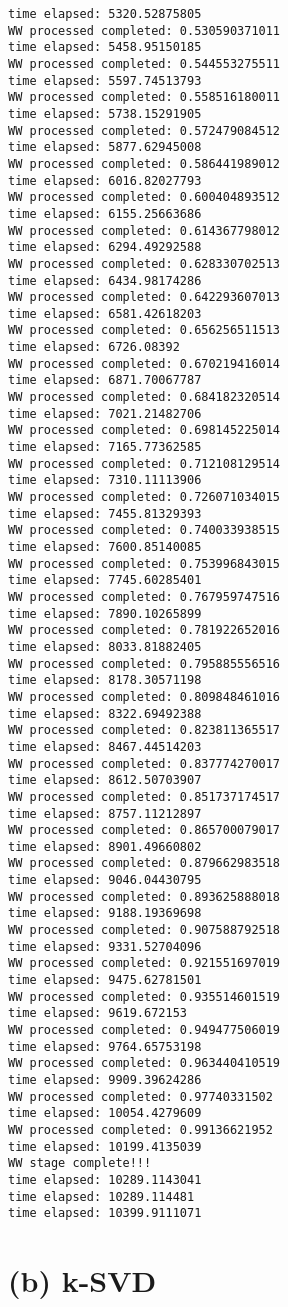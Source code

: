\documentclass[11pt]{article}
\begin{document}
\begin{Verbatim}[commandchars=\\\{\}]
time elapsed: 5320.52875805
WW processed completed: 0.530590371011
time elapsed: 5458.95150185
WW processed completed: 0.544553275511
time elapsed: 5597.74513793
WW processed completed: 0.558516180011
time elapsed: 5738.15291905
WW processed completed: 0.572479084512
time elapsed: 5877.62945008
WW processed completed: 0.586441989012
time elapsed: 6016.82027793
WW processed completed: 0.600404893512
time elapsed: 6155.25663686
WW processed completed: 0.614367798012
time elapsed: 6294.49292588
WW processed completed: 0.628330702513
time elapsed: 6434.98174286
WW processed completed: 0.642293607013
time elapsed: 6581.42618203
WW processed completed: 0.656256511513
time elapsed: 6726.08392
WW processed completed: 0.670219416014
time elapsed: 6871.70067787
WW processed completed: 0.684182320514
time elapsed: 7021.21482706
WW processed completed: 0.698145225014
time elapsed: 7165.77362585
WW processed completed: 0.712108129514
time elapsed: 7310.11113906
WW processed completed: 0.726071034015
time elapsed: 7455.81329393
WW processed completed: 0.740033938515
time elapsed: 7600.85140085
WW processed completed: 0.753996843015
time elapsed: 7745.60285401
WW processed completed: 0.767959747516
time elapsed: 7890.10265899
WW processed completed: 0.781922652016
time elapsed: 8033.81882405
WW processed completed: 0.795885556516
time elapsed: 8178.30571198
WW processed completed: 0.809848461016
time elapsed: 8322.69492388
WW processed completed: 0.823811365517
time elapsed: 8467.44514203
WW processed completed: 0.837774270017
time elapsed: 8612.50703907
WW processed completed: 0.851737174517
time elapsed: 8757.11212897
WW processed completed: 0.865700079017
time elapsed: 8901.49660802
WW processed completed: 0.879662983518
time elapsed: 9046.04430795
WW processed completed: 0.893625888018
time elapsed: 9188.19369698
WW processed completed: 0.907588792518
time elapsed: 9331.52704096
WW processed completed: 0.921551697019
time elapsed: 9475.62781501
WW processed completed: 0.935514601519
time elapsed: 9619.672153
WW processed completed: 0.949477506019
time elapsed: 9764.65753198
WW processed completed: 0.963440410519
time elapsed: 9909.39624286
WW processed completed: 0.97740331502
time elapsed: 10054.4279609
WW processed completed: 0.99136621952
time elapsed: 10199.4135039
WW stage complete!!!
time elapsed: 10289.1143041
time elapsed: 10289.114481
time elapsed: 10399.9111071

    \end{Verbatim}

    \section{(b) k-SVD}\label{b-k-svd}
\end{document}
